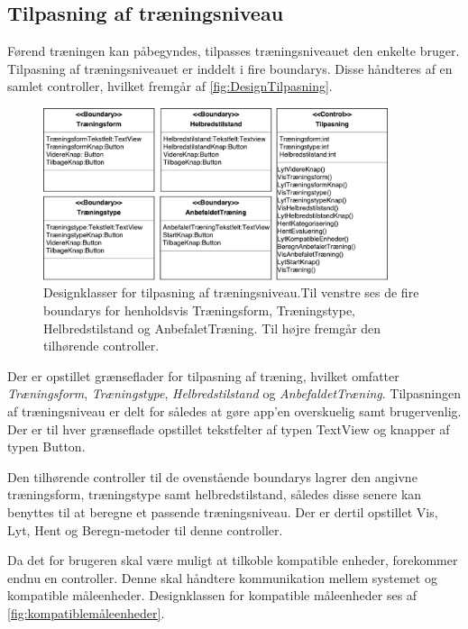 \subsection*{Tilpasning af træningsniveau}
Førend træningen kan påbegyndes, tilpasses træningsniveauet den enkelte bruger. Tilpasning af træningsniveauet er inddelt i fire boundarys. Disse håndteres af en samlet controller, hvilket fremgår af \autoref{fig:DesignTilpasning}.

\begin{figure} [H]
\centering
\includegraphics[width=0.9\textwidth]{figures/MVC/MVCTilpasning}
\caption{Designklasser for tilpasning af træningsniveau.Til venstre ses de fire boundarys for henholdsvis Træningsform, Træningstype, Helbredstilstand og AnbefaletTræning. Til højre fremgår den tilhørende controller.}
\label{fig:DesignTilpasning}
\end{figure}

\noindent
Der er opstillet grænseflader for tilpasning af træning, hvilket omfatter \textit{Træningsform}, \textit{Træningstype}, \textit{Helbredstilstand} og \textit{AnbefaldetTræning}. Tilpasningen af træningsniveau er delt for således at gøre app’en overskuelig samt brugervenlig. Der er til hver grænseflade opstillet tekstfelter af typen TextView og knapper af typen Button.   

Den tilhørende controller til de ovenstående boundarys lagrer den angivne træningsform, træningstype samt helbredstilstand, således disse senere kan benyttes til at beregne et passende træningsniveau. Der er dertil opstillet Vis, Lyt, Hent og Beregn-metoder til denne controller. 

Da det for brugeren skal være muligt at tilkoble kompatible enheder, forekommer endnu en controller. Denne skal håndtere kommunikation mellem systemet og kompatible måleenheder. Designklassen for kompatible måleenheder ses af \autoref{fig:kompatiblemåleenheder}.

